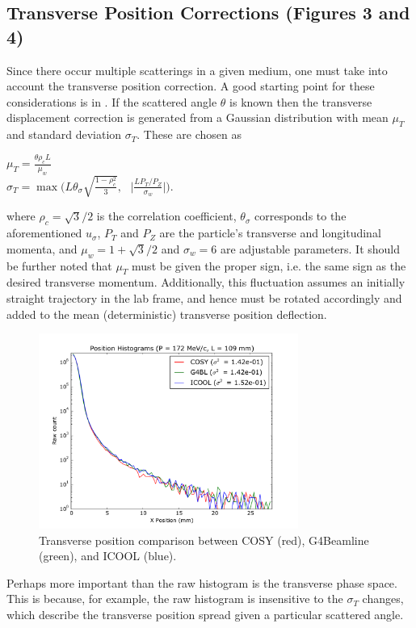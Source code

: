 \documentclass{jacow}
\begin{document}
\subsection{Transverse Position Corrections (Figures 3 and 4)}
Since there occur multiple scatterings in a given medium, one must take into account the transverse position correction. A good starting point for these considerations is in \cite{PDG}. If the scattered angle $\theta$ is known then the transverse displacement correction is generated from a Gaussian distribution with mean $\mu_T$ and standard deviation $\sigma_T$. These are chosen as \begin{center} 
$\mu_T = \frac{\theta \rho_c L}{\mu_w}$
\\ $\sigma_T = \max\Big(L \theta_\sigma \sqrt{\frac{1-\rho_c^2}{3}},\text{ }\Big|\frac{L P_T / P_Z}{\sigma_w}\Big|\Big).
$\end{center}
where $\rho_c = \sqrt{3}/2$ is the correlation coefficient, $\theta_\sigma$ corresponds to the aforementioned $u_\sigma$, $P_T$ and $P_Z$ are the particle's transverse and longitudinal momenta, and $\mu_w=1+\sqrt{3}/2$ and $\sigma_w=6$ are adjustable parameters. It should be further noted that $\mu_T$ must be given the proper sign, i.e. the same sign as the desired transverse momentum. Additionally, this fluctuation assumes an initially straight trajectory in the lab frame, and hence must be rotated accordingly and added to the mean (deterministic) transverse position deflection.

\begin{figure}[h!]
\centering
\includegraphics*[width=85mm]{Figures/figure3.pdf}
\caption{Transverse position comparison between COSY (red), G4Beamline (green), and ICOOL (blue).}
\end{figure}

Perhaps more important than the raw histogram is the transverse phase space. This is because, for example, the raw histogram is insensitive to the $\sigma_T$ changes, which describe the transverse position spread given a particular scattered angle. 
\end{document}
